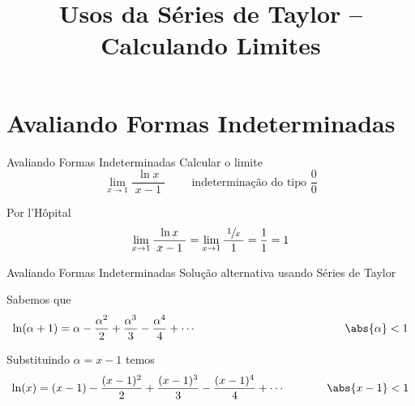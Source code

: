
\usepackage{integracao_e_series}

\title{Usos da Séries de Taylor -- Calculando Limites}



\addtitle

\section{Avaliando Formas Indeterminadas}

\begin{frame}{Avaliando Formas Indeterminadas}
Calcular o limite
\[
  \lim_{x\to 1} \frac{\ln x}{\;x-1\;} \qquad\text{ indeterminação do tipo } \frac{0}{0}
\]

\pause
\vspace{\baselineskip}
Por l'Hôpital
\[
  \lim_{x\to 1} \frac{\ln x}{\;x-1\;} = \lim_{x\to 1} \frac{\;\sfrac{1}{x}\;}{1} = \frac{1}{1} = 1
\]
\end{frame}

\begin{frame}{Avaliando Formas Indeterminadas}
Solução alternativa usando Séries de Taylor

\pause
\vspace{\baselineskip}
Sabemos que
\[
  \ln(\alpha+1) = \alpha - \frac{\alpha^2}{2}
                         + \frac{\alpha^3}{3}
                         - \frac{\alpha^4}{4}
                         + \cdots
  \hspace{46mm} \abs{\alpha} < 1
\]

\pause
\vspace{0.5\baselineskip}
Substituindo $\alpha=x-1$ temos
\[
  \ln(x) = (x-1) - \frac{(x-1)^2}{2}
                 + \frac{(x-1)^3}{3}
                 - \frac{(x-1)^4}{4}
                 + \cdots
  \hspace{13mm} \abs{x-1} < 1
\]
\end{frame}

